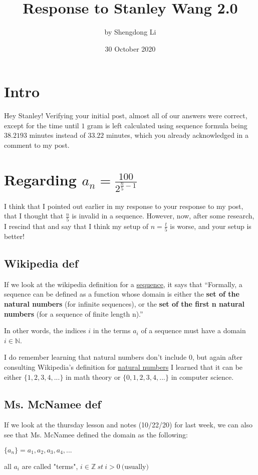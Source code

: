 \documentclass[12pt]{article}
\begin{document}
\title{Response to Stanley Wang 2.0}
\author{by Shengdong Li}
\date{30 October 2020}
\maketitle

\section{Intro}
Hey Stanley!
Verifying your initial post, almost all of our answers were correct, except for the time until $1$ gram is left calculated using sequence formula being $38.2193$ minutes instead of $33.22$ minutes, which you already acknowledged in a comment to my post.

\section{Regarding \texorpdfstring{$a_{n}=\frac{100}{2^{\frac{n}{5}-1}}$}{Lg}}
I think that 
I pointed out earlier in my response to your response to my post, that I thought that $\frac{n}{5}$ is invalid in a sequence. However, now, after some research, I rescind that and say that I think my setup of $n=\frac{t}{5}$ is worse, and your setup is better!
\subsection{Wikipedia def}
If we look at the wikipedia definition for a \href{https://en.wikipedia.org/wiki/Sequence}{sequence}, it says that ``Formally, a sequence can be defined as a function whose domain is either the \textbf{set of the natural numbers} (for infinite sequences), or the \textbf{set of the first n natural numbers} (for a sequence of finite length n).''

In other words, the indices $i$ in the terms $a_i$ of a sequence must have a domain $i\in\mathbb{N}$.

I do remember learning that natural numbers don't include $0$, but again after consulting Wikipedia's definition for \href{https://en.wikipedia.org/wiki/Natural_number}{natural numbers} I learned that it can be either $\{1, 2, 3, 4, ...\}$ in math theory or $\{0, 1, 2, 3, 4, ...\}$ in computer science.
\subsection{Ms. McNamee def}
If we look at the thursday lesson and notes (10/22/20) for last week, we can also see that Ms. McNamee defined the domain as the following: \par
$\{a_n\}=a_1, a_2, a_3, a_4,...$\par
all $a_i$ are called "terms", $i\in\mathbb{Z}\:st\:i>0\:\text{(usually)}$
\end{document}
